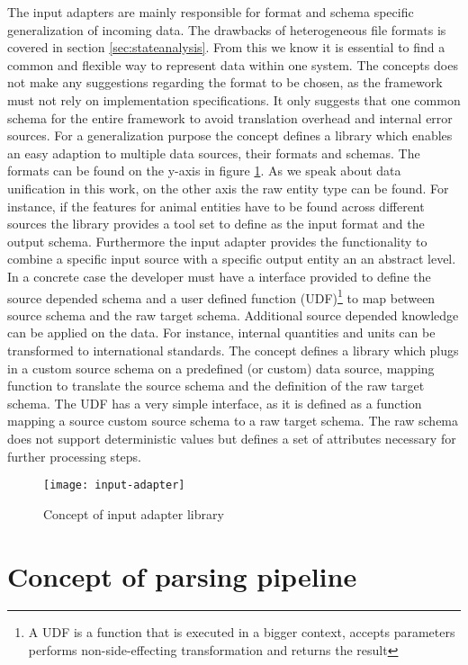 The input adapters are mainly responsible for format and schema specific generalization of incoming data. The drawbacks of heterogeneous file formats is covered in section \ref{sec:stateanalysis}. From this we know it is essential to find a common and flexible way to represent data within one system. The concepts does not make any suggestions regarding the format to be chosen, as the framework must not rely on implementation specifications. It only suggests that one common schema for the entire framework to avoid translation overhead and internal error sources. For a generalization purpose the concept defines a library which enables an easy adaption to multiple data sources, their formats and schemas. The formats can be found on the y-axis in figure \ref{fig:inputadapter}. As we speak about data unification in this work, on the other axis the raw entity type can be found. For instance, if the features for animal entities have to be found across different sources the library provides a tool set to define as the input format and the output schema. Furthermore the input adapter provides the functionality to combine a specific input source with a specific output entity an an abstract level. In a concrete case the developer must have a interface provided to define the source depended schema and a user defined function (UDF)\footnote{A UDF is a function that is executed in a bigger context, accepts parameters performs non-side-effecting transformation and returns the result} to map between source schema and the raw target schema. Additional source depended knowledge can be applied on the data. For instance, internal quantities and units can be transformed to international standards. The concept defines a library which plugs in a custom source schema on a predefined (or custom) data source, mapping function to translate the source schema and the definition of the raw target schema. The UDF has a very simple interface, as it is defined as a function mapping a source custom source schema to a raw target schema. The raw schema does not support deterministic values but defines a set of attributes necessary for further processing steps.

\begin{figure}[htb]
  \centering
  \texttt{[image: input-adapter]}\\
  \caption{Concept of input adapter library}
  \label{fig:inputadapter}
\end{figure}

\section{Concept of parsing pipeline}

